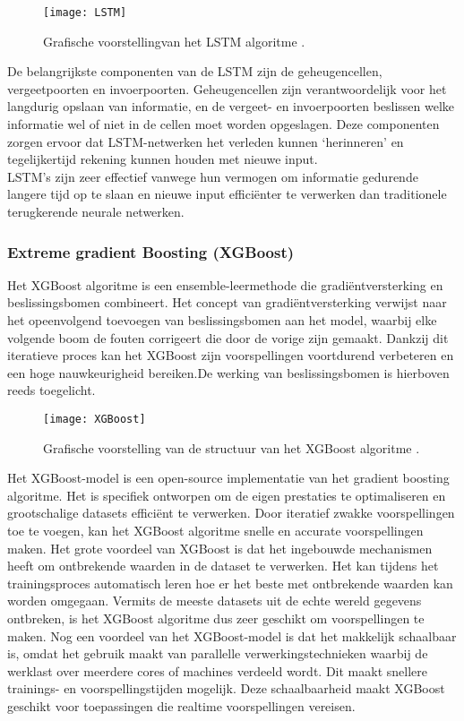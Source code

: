 \begin{figure}[h!]
    \centering\texttt{[image: LSTM]}
    \caption{\label{fig:LSTM}Grafische voorstellingvan het LSTM algoritme \autocite{Thomas2023}.}
\end{figure} 

De belangrijkste componenten van de LSTM zijn de geheugencellen, vergeetpoorten en invoerpoorten. Geheugencellen zijn verantwoordelijk voor het langdurig opslaan van informatie, en de vergeet- en invoerpoorten beslissen welke informatie wel of niet in de cellen moet worden opgeslagen. Deze componenten zorgen ervoor dat LSTM-netwerken het verleden kunnen ‘herinneren’ en tegelijkertijd rekening kunnen houden met nieuwe input. \\

LSTM's zijn zeer effectief vanwege hun vermogen om informatie gedurende langere tijd op te slaan en nieuwe input efficiënter te verwerken dan traditionele terugkerende neurale netwerken.

\subsubsection{Extreme gradient Boosting (XGBoost)}

Het XGBoost algoritme is een ensemble-leermethode die gradiëntversterking en beslissingsbomen combineert. Het concept van gradiëntversterking verwijst naar het opeenvolgend toevoegen van beslissingsbomen aan het model, waarbij elke volgende boom de fouten corrigeert die door de vorige zijn gemaakt. Dankzij dit iteratieve proces kan het XGBoost zijn voorspellingen voortdurend verbeteren en een hoge nauwkeurigheid bereiken.De werking van beslissingsbomen is hierboven reeds toegelicht. \\

\begin{figure}[h!]
    \centering\texttt{[image: XGBoost]}
    \caption{\label{fig:XGBoost}Grafische voorstelling van de structuur van het XGBoost algoritme \autocite{Tan2024}.}
\end{figure} 

Het XGBoost-model is een open-source implementatie van het gradient boosting algoritme. Het is specifiek ontworpen om de eigen prestaties te optimaliseren en grootschalige datasets efficiënt te verwerken. Door iteratief zwakke voorspellingen toe te voegen, kan het XGBoost algoritme snelle en accurate voorspellingen maken. Het grote voordeel van XGBoost is dat het ingebouwde mechanismen heeft om ontbrekende waarden in de dataset te verwerken. Het kan tijdens het trainingsproces automatisch leren hoe er het beste met ontbrekende waarden kan worden omgegaan. Vermits de meeste datasets uit de echte wereld gegevens ontbreken, is het XGBoost algoritme dus zeer geschikt om voorspellingen te maken. Nog een voordeel van het XGBoost-model is dat het makkelijk schaalbaar is, omdat het gebruik maakt van parallelle verwerkingstechnieken waarbij de werklast over meerdere cores of machines verdeeld wordt. Dit maakt snellere trainings- en voorspellingstijden mogelijk. Deze schaalbaarheid maakt XGBoost geschikt voor toepassingen die realtime voorspellingen vereisen.

